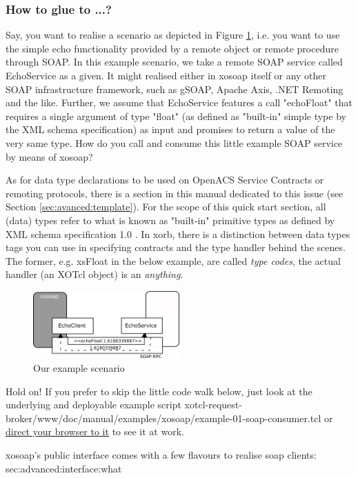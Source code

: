   \subsubsection{How to glue to ...?}\label{sec:xosoap:quickstart:glueto}
  Say, you want to realise a scenario as depicted in Figure \ref{fig:quickstart:xosoap:1}, i.e. you want to 
use the simple echo functionality provided by a remote object or remote procedure through SOAP. In this 
example scenario, we take a remote SOAP service called EchoService as a given. It might realised 
either in xosoap itself or any other SOAP infrastructure framework, such as gSOAP, Apache Axis, .NET 
Remoting and the like. Further, we assume that  EchoService features a call "echoFloat" that requires a 
single argument of type "float" (as defined as "built-in" simple type by the XML schema specification) as 
input and promises to return a value of the very same type. How do you call and consume this little 
example SOAP service by means of xosoap?
\begin{hints}
\item As for data type declarations to be used on OpenACS Service Contracts or remoting protocols, there is a section in this manual dedicated to this issue (see Section \ref{sec:avanced:template}). For the scope of this quick start section, all (data) types refer to what is known as "built-in" primitive types as defined by  XML schema specification 1.0 \cite{w3c:2004}. In xorb, there is a distinction between data types tags you can use in specifying contracts and the type handler behind the scenes. The former, e.g. xsFloat in the below example, are called \emph{type codes}, the actual handler  (an XOTcl object) is an \emph{anything}.
\end{hints}
\begin{figure}[htbp]
\begin{center}
\includegraphics[width=0.5\textwidth]{img/consumer.png}
\caption{Our example scenario}
\label{fig:quickstart:xosoap:1}
\end{center}
\end{figure}
\begin{hints}
\item Hold on! If you prefer to skip the little code walk below, just look at the underlying and deployable 
example script xotcl-request-broker/www/doc/manual/examples/xosoap/example-01-soap-consumer.tcl 
or \href{http://openacs-dotlrn.wu-wien.ac.at/request-broker/doc/manual/examples/xosoap/example-01-
soap-consumer.tcl}{direct your browser to it} to see it at work.
\item xosoap's public interface comes with a few flavours to realise soap clients: \nameref
{sec:advanced:interface:what}
\end{hints}

